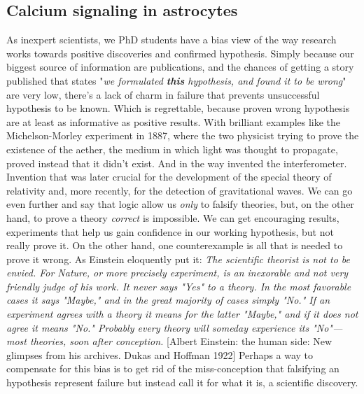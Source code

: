 \subsection{Calcium signaling in astrocytes}
\label{chap1:sec:2:subsec2:astro_calcium_signals}
As inexpert scientists, we PhD students have a bias view of the way research works towards positive discoveries and confirmed hypothesis. 
Simply because our biggest source of information are publications, and the chances of getting a story published that states "\textit{we formulated \textbf{this} hypothesis, and found it to be wrong}" are very low, there's a lack of charm in failure that prevents unsuccessful hypothesis to be known. 
Which is regrettable, because proven wrong hypothesis are at least as informative as positive results.
With brilliant examples like the Michelson-Morley experiment in 1887, where the two physicist trying to prove the existence of the aether, the medium in which light was thought to propagate, proved instead that it didn't exist.  
And in the way invented the interferometer. 
Invention that was later crucial for the development of the special theory of relativity and, more recently, for the detection of gravitational waves.
We can go even further and say that logic allow us \textit{only} to falsify theories, but, on the other hand, to prove a theory \textit{correct} is impossible. 
We can get encouraging results, experiments that help us gain confidence in our working hypothesis, but not really prove it.
On the other hand, one counterexample is all that is needed to prove it wrong.
As Einstein eloquently put it: \textit{The scientific theorist is not to be envied. For Nature, or more precisely experiment, is an inexorable and not very friendly judge of his work. It never says "Yes" to a theory. In the most favorable cases it says "Maybe," and in the great majority of cases simply "No." If an experiment agrees with a theory it means for the latter "Maybe," and if it does not agree it means "No." Probably every theory will someday experience its "No"—most theories, soon after conception.} [Albert Einstein: the human side: New glimpses from his archives. Dukas and Hoffman 1922]
Perhaps a way to compensate for this bias is to get rid of the miss-conception that falsifying an hypothesis represent failure but instead call it for what it is, a scientific discovery.  

